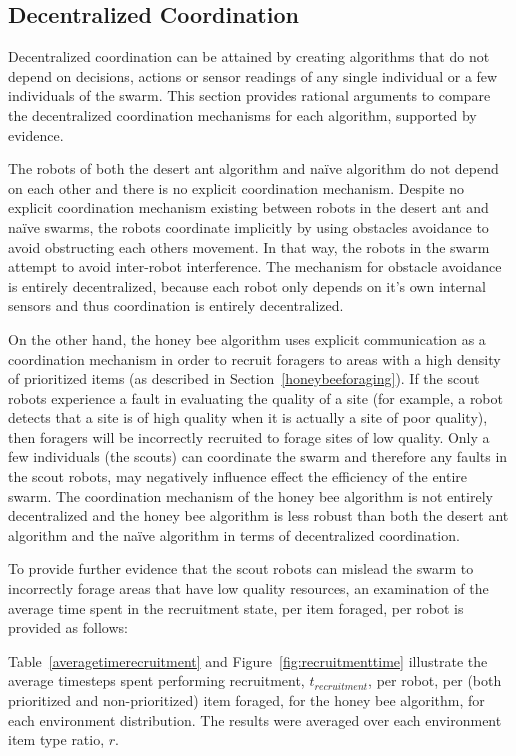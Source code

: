 \subsection{Decentralized Coordination}
\label{results:decentralizedcoordination}

Decentralized coordination can be attained by creating algorithms that do not depend on decisions, actions or sensor readings of any single individual or a few individuals of the swarm. This section provides rational arguments to compare the decentralized coordination mechanisms for each algorithm, supported by evidence. 

The robots of both the desert ant algorithm and na\"ive algorithm do not depend on each other and there is no explicit coordination mechanism. Despite no explicit coordination mechanism existing between robots in the desert ant and na\"ive swarms, the robots coordinate implicitly by using obstacles avoidance to avoid obstructing each others movement. In that way, the robots in the swarm attempt to avoid inter-robot interference. The mechanism for obstacle avoidance is entirely decentralized, because each robot only depends on it's own internal sensors and thus coordination is entirely decentralized.

On the other hand, the honey bee algorithm uses explicit communication as a coordination mechanism in order to recruit foragers to areas with a high density of prioritized items (as described in Section~\ref{honeybeeforaging}). If the scout robots experience a fault in evaluating the quality of a site (for example, a robot detects that a site is of high quality when it is actually a site of poor quality), then foragers will be incorrectly recruited to forage sites of low quality. Only a few individuals (the scouts) can coordinate the swarm and therefore any faults in the scout robots, may negatively influence effect the efficiency of the entire swarm. The coordination mechanism of the honey bee algorithm is not entirely decentralized and the honey bee algorithm is less robust than both the desert ant algorithm and the na\"ive algorithm in terms of decentralized coordination.

To provide further evidence that the scout robots can mislead the swarm to incorrectly forage areas that have low quality resources, an examination of the average time spent in the recruitment state, per item foraged, per robot is provided as follows: 

Table~\ref{averagetimerecruitment} and Figure~\ref{fig:recruitmenttime} illustrate the average timesteps spent performing recruitment, $t_{recruitment}$, per robot, per (both prioritized and non-prioritized) item foraged, for the honey bee algorithm, for each environment distribution. The results were averaged over each environment item type ratio, $r$. 

